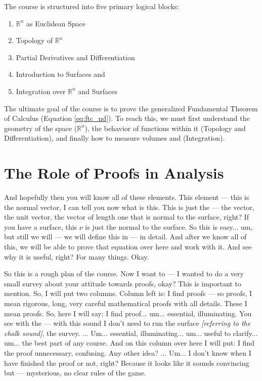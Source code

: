 \begin{math-stroke}
The course is structured into five primary logical blocks:
\begin{enumerate}
    \setcounter{enumi}{0} \item $\mathbb{R}^n$ as Euclidean Space
    \setcounter{enumi}{1} \item Topology of $\mathbb{R}^n$
    \setcounter{enumi}{2} \item Partial Derivatives and Differentiation
    \setcounter{enumi}{3} \item Introduction to Surfaces and 
    \setcounter{enumi}{4} \item Integration over $\mathbb{R}^n$ and Surfaces
\end{enumerate}

\begin{explanation-of-steps}
The ultimate goal of the course is to prove the generalized Fundamental Theorem of Calculus (Equation \ref{eq:ftc_nd}). To reach this, we must first understand the geometry of the space ($\mathbb{R}^n$), the behavior of functions within it (Topology and Differentiation), and finally how to measure volumes and  (Integration).
\end{explanation-of-steps}
\end{math-stroke}

\section{The Role of Proofs in Analysis}

\begin{spoken-clean}[00:12:30 - 00:13:50]
And hopefully then you will know all of these elements. This element --- this is the normal vector, I can tell you now what is this. This is just the --- the vector, the unit vector, the vector of length one that is normal to the surface, right? If you have a surface, this $\nu$ is just the normal to the surface. So this is easy... um, but still we will --- we will define this in --- in detail. And after we know all of this, we will be able to prove that equation over here and work with it. And see why it is useful, right? For many things. Okay. 

So this is a rough plan of the course. Now I want to --- I wanted to do a very small survey about your attitude towards proofs, okay? This is important to mention. So, I will put two columns. Column left is: I find proofs --- so proofs, I mean rigorous, long, very careful mathematical proofs with all details. These I mean proofs. So, here I will say: I find proof... um... essential, illuminating. You see with the --- with this sound I don't need to run the surface \textit{[referring to the chalk sound]}, the survey. ... Um... essential, illuminating... um... useful to clarify... um... the best part of any course. And on this column over here I will put: I find the proof unnecessary, confusing. Any other idea? ... Um... I don't know when I have finished the proof or not, right? Because it looks like it sounds convincing but --- mysterious, no clear rules of the game.
\end{spoken-clean}

